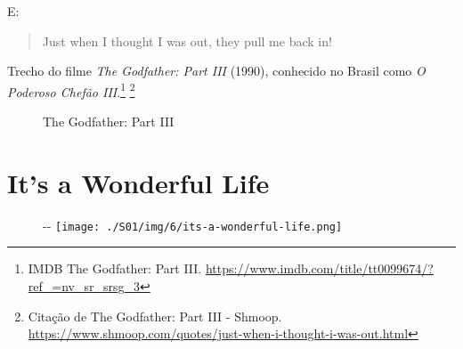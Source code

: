 \saveparinfos
\noindent
\begin{minipage}[c]{0.5\textwidth}\useparinfo

E:

\begin{quote}
Just when I thought I was out, they pull me back in!
\end{quote}

Trecho do filme \emph{The Godfather: Part III} (1990), conhecido no
Brasil como \emph{O Poderoso Chefão III}.\footnote{\sloppy IMDB The Godfather: Part III. \url{https://www.imdb.com/title/tt0099674/?ref_=nv_sr_srsg_3}}
\footnote{\sloppy Citação de The Godfather: Part III - Shmoop. \url{https://www.shmoop.com/quotes/just-when-i-thought-i-was-out.html}}

\end{minipage}\hfill
\begin{minipage}[c]{0.5\textwidth}

\begin{figure}
  \centering
    \caption{The Godfather: Part III\label{fig:the-godfather-part-iii}}
\end{figure}

\end{minipage}

\hypertarget{its-a-wonderful-life}{%
\section{It's a Wonderful Life}\label{its-a-wonderful-life}}

\begin{figure}[!ht]
  \begin{adjustwidth}{-\oddsidemargin-1in}{-\rightmargin}
    \centering
    \texttt{[image: ./S01/img/6/its-a-wonderful-life.png]}
  \end{adjustwidth}
\end{figure}

